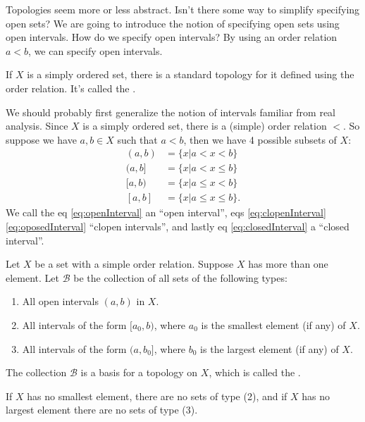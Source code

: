 \begin{prob}
Topologies seem more or less abstract. Isn't there some way to
simplify specifying open sets? We are going to introduce the
notion of specifying open sets using open intervals. How do we
specify open intervals? By using an order relation $a < b$, we
can specify open intervals.
\end{prob}

If $X$ is a simply ordered set, there is a standard topology for
it defined using the order relation. It's called the
.

We should probably first generalize the notion of intervals
familiar from real analysis. Since $X$ is a simply ordered set,
there is a (simple) order relation $<$. So suppose we have
$a,b\in X$ such that $a<b$, then we have 4 possible subsets of
$X$:
\begin{subequations}
\begin{align}
(a,b) &= \{x|a<x<b\}\label{eq:openInterval}\\
(a,b] &= \{x|a<x\leq b\}\label{eq:clopenInterval}\\
[a,b) &= \{x|a\leq x<b\}\label{eq:oposedInterval}\\
[a,b] &= \{x|a\leq x\leq b\}\label{eq:closedInterval}.
\end{align}
\end{subequations}
We call the eq \eqref{eq:openInterval} an ``open interval'', eqs
\eqref{eq:clopenInterval} \eqref{eq:oposedInterval} ``clopen
intervals'', and lastly eq \eqref{eq:closedInterval} a ``closed
interval''.

\begin{defn}\label{defn:orderTopology}
Let $X$ be a set with a simple order relation. Suppose $X$ has
more than one element. Let $\mathscr{B}$ be the collection of all
sets of the following types:
\begin{enumerate}
\item All open intervals $(a,b)$ in $X$.
\item All intervals of the form $[a_{0},b)$, where $a_0$ is the
  smallest element (if any) of $X$.
\item All intervals of the form $(a,b_{0}]$, where $b_{0}$ is the
  largest element (if any) of $X$.
\end{enumerate}
The collection $\mathscr{B}$ is a basis for a topology on $X$,
which is called the .
\end{defn}
\begin{rmk}\label{rmk:onOrderTopology}
If $X$ has no smallest element, there are no sets of type (2),
and if $X$ has no largest element there are no sets of type (3).
\end{rmk}

